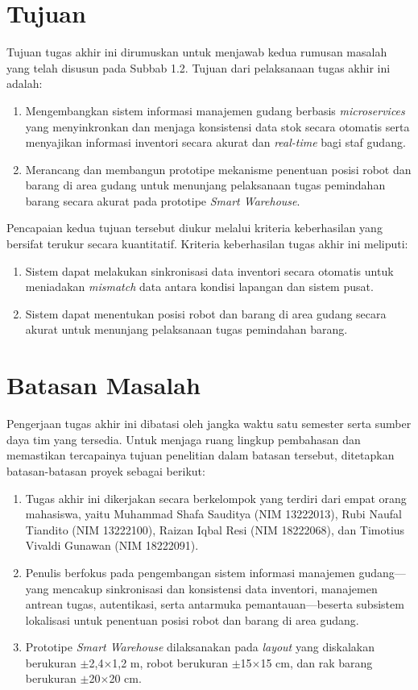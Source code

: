 \section{Tujuan}
Tujuan tugas akhir ini dirumuskan untuk menjawab kedua rumusan masalah yang telah disusun pada Subbab 1.2. Tujuan dari pelaksanaan tugas akhir ini adalah:
\begin{enumerate}
\item Mengembangkan sistem informasi manajemen gudang berbasis \textit{microservices} yang menyinkronkan dan menjaga konsistensi data stok secara otomatis serta menyajikan informasi inventori secara akurat dan \textit{real-time} bagi staf gudang.
\item Merancang dan membangun prototipe mekanisme penentuan posisi robot dan barang di area gudang untuk menunjang pelaksanaan tugas pemindahan barang secara akurat pada prototipe \textit{Smart Warehouse}.
\end{enumerate}
Pencapaian kedua tujuan tersebut diukur melalui kriteria keberhasilan yang bersifat terukur secara kuantitatif. Kriteria keberhasilan tugas akhir ini meliputi:
\begin{enumerate}
\item Sistem dapat melakukan sinkronisasi data inventori secara otomatis untuk meniadakan \textit{mismatch} data antara kondisi lapangan dan sistem pusat.
\item Sistem dapat menentukan posisi robot dan barang di area gudang secara akurat untuk menunjang pelaksanaan tugas pemindahan barang.
\end{enumerate}

\section{Batasan Masalah}
\label{sec:batasan-masalah}
Pengerjaan tugas akhir ini dibatasi oleh jangka waktu satu semester serta sumber daya tim yang tersedia. Untuk menjaga ruang lingkup pembahasan dan memastikan tercapainya tujuan penelitian dalam batasan tersebut, ditetapkan batasan-batasan proyek sebagai berikut:
\begin{enumerate}
\item Tugas akhir ini dikerjakan secara berkelompok yang terdiri dari empat orang mahasiswa, yaitu Muhammad Shafa Sauditya (NIM 13222013), Rubi Naufal Tiandito (NIM 13222100), Raizan Iqbal Resi (NIM 18222068), dan Timotius Vivaldi Gunawan (NIM 18222091).
\item Penulis berfokus pada pengembangan sistem informasi manajemen gudang---yang mencakup sinkronisasi dan konsistensi data inventori, manajemen antrean tugas, autentikasi, serta antarmuka pemantauan---beserta subsistem lokalisasi untuk penentuan posisi robot dan barang di area gudang.
\item Prototipe \textit{Smart Warehouse} dilaksanakan pada \textit{layout} yang diskalakan berukuran $\pm$2,4$\times$1,2 m, robot berukuran $\pm$15$\times$15 cm, dan rak barang berukuran $\pm$20$\times$20 cm.
\end{enumerate}

